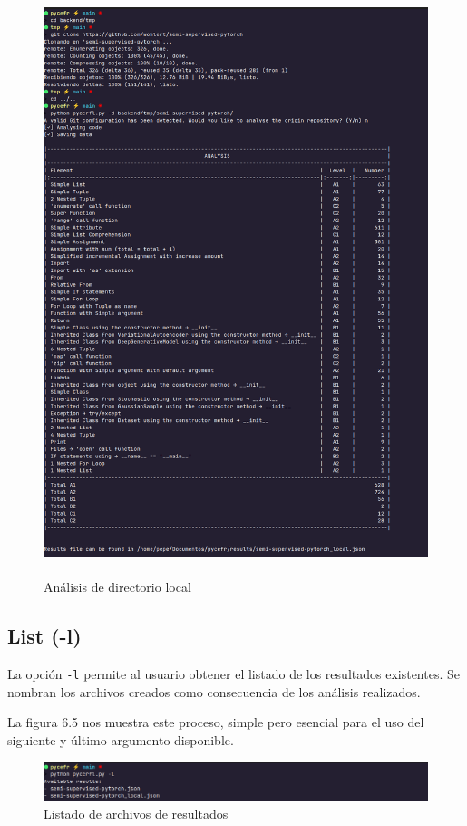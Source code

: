 \documentclass[a4paper, 12pt]{book}
\begin{document}
\newpage
\vspace{1em}
\begin{figure}[H]
    \centering
    \includegraphics[height=17cm, keepaspectratio]{img/results/backend_exe_d.png}
    \caption{Análisis de directorio local}
    \label{fig:analysis_dir}
\end{figure}

\subsection{List (-l)}

La opción \texttt{-l} permite al usuario obtener el listado de los resultados existentes. Se nombran los archivos creados como consecuencia de los análisis realizados.

La figura 6.5 nos muestra este proceso, simple pero esencial para el uso del siguiente y último argumento disponible.

\begin{figure}
    \centering
    \includegraphics[width=\textwidth, keepaspectratio]{img/results/backend_exe_l.png}
    \caption{Listado de archivos de resultados}
    \label{fig:analysis_list}
\end{figure}
\end{document}
